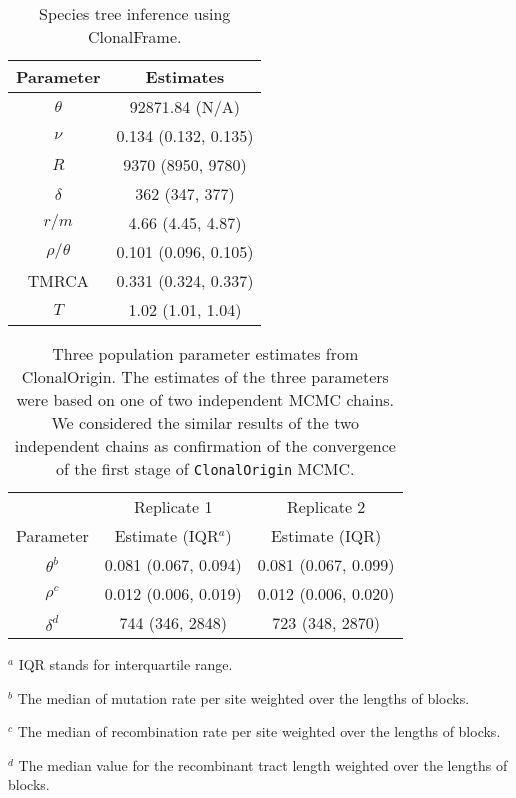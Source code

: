 \documentclass[english]{article}
\providecommand{\tabularnewline}{\\}
\begin{document}
\begin{table}
\caption{\label{tab:clonalframe}Species tree inference using ClonalFrame.}
\noindent \centering{}\begin{tabular}{cc}
Parameter & Estimates\tabularnewline
\hline
$\theta$ & 92871.84 (N/A)\tabularnewline
$\nu$ & 0.134 (0.132, 0.135)\tabularnewline
$R$ & 9370 (8950, 9780)\tabularnewline
$\delta$ & 362 (347, 377)\tabularnewline
$r/m$ & 4.66 (4.45, 4.87)\tabularnewline
$\rho/\theta$ & 0.101 (0.096, 0.105)\tabularnewline
TMRCA & 0.331 (0.324, 0.337)\tabularnewline
$T$ & 1.02 (1.01, 1.04)\tabularnewline
\hline
\end{tabular}
\end{table}
\clearpage{}

\begin{table}
\caption{\label{tab:three}Three population parameter estimates from
ClonalOrigin. 
The estimates of the three parameters were based on one of two independent
MCMC chains.  We considered the similar 
results of the two independent chains as confirmation of 
the convergence of the first stage of \texttt{ClonalOrigin} MCMC.
}
\noindent \centering{}\begin{tabular}{ccc}
& Replicate 1 & Replicate 2\tabularnewline
Parameter & Estimate (IQR$^a$) & Estimate (IQR)\tabularnewline
\hline
$\theta^b$ & 0.081 (0.067, 0.094) & 0.081 (0.067, 0.099)\tabularnewline
$\rho^c$ & 0.012 (0.006, 0.019) & 0.012 (0.006, 0.020)\tabularnewline
$\delta^d$ & 744 (346, 2848) & 723 (348, 2870)\tabularnewline
\end{tabular}

$^a$ IQR stands for interquartile range.

$^b$ The median of mutation rate per site weighted over the lengths of blocks. 

$^c$ The median of recombination rate per site weighted over the lengths of blocks.

$^d$ The median value for the recombinant tract length weighted over the lengths of blocks.

\end{table}
\clearpage{}
\end{document}
